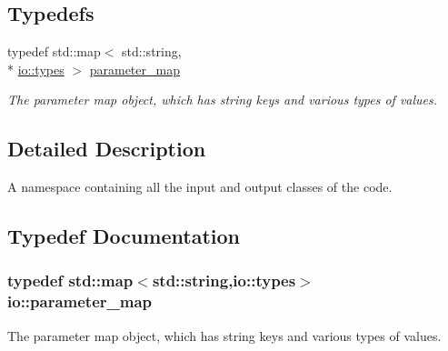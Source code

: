 \subsection*{Typedefs}
\begin{DoxyCompactItemize}
\item 
typedef std\-::map$<$ std\-::string, \\*
\hyperlink{unionio_1_1types}{io\-::types} $>$ \hyperlink{namespaceio_a1c55c654666eeece6a9724f453fdbd87}{parameter\-\_\-map}
\begin{DoxyCompactList}\small\item\em The parameter map object, which has string keys and various types of values. \end{DoxyCompactList}\end{DoxyCompactItemize}


\subsection{Detailed Description}
A namespace containing all the input and output classes of the code. 

 

\subsection{Typedef Documentation}
\hypertarget{namespaceio_a1c55c654666eeece6a9724f453fdbd87}{
\subsubsection[{parameter\-\_\-map}]{\setlength{\rightskip}{0pt plus 5cm}typedef std\-::map$<$std\-::string,{\bf io\-::types}$>$ {\bf io\-::parameter\-\_\-map}}}\label{namespaceio_a1c55c654666eeece6a9724f453fdbd87}


The parameter map object, which has string keys and various types of values. 



 